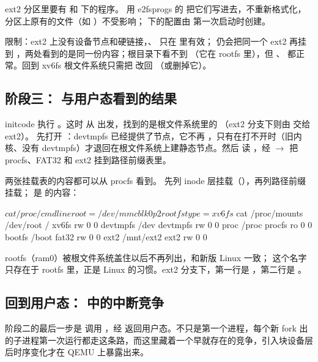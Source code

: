 ext2 分区里要有  和  下的程序。 用 e2fsprogs 的  把它们写进去，不重新格式化，分区上原有的文件（如 ）不受影响； 下的配置由  第一次启动时创建。

限制：ext2 上没有设备节点和硬链接，、 只在  里有效； 仍会把同一个 ext2 再挂到 ，两处看到的是同一份内容；根目录下看不到 （它在 rootfs 里），但 、 都正常。回到 xv6fs 根文件系统只需把  改回 （或删掉它）。

\subsection{阶段三： 与用户态看到的结果}
\label{sec:ns-stage3}

initcode 执行 。这时  从  出发，找到的是根文件系统里的 （ext2 分支下则由  交给 ext2）。 先打开 ：devtmpfs 已经提供了节点，它不再 ，只有在打不开时（旧内核、没有 devtmpfs）才退回在根文件系统上建静态节点。然后  读 ，经  $\to$  把 procfs、FAT32 和 ext2 挂到路径前缀表里。

两张挂载表的内容都可以从 procfs 看到。 先列 inode 层挂载（），再列路径前缀挂载； 是  的内容：

\begin{txtcode}
$ cat /proc/cmdline
root=/dev/mmcblk0p2 rootfstype=xv6fs
$ cat /proc/mounts
/dev/root / xv6fs rw 0 0
devtmpfs /dev devtmpfs rw 0 0
proc /proc procfs ro 0 0
bootfs /boot fat32 rw 0 0
ext2 /mnt/ext2 ext2 rw 0 0
\end{txtcode}

rootfs（ram0）被根文件系统盖住以后不再列出，和新版 Linux 一致； 这个名字只存在于 rootfs 里，正是 Linux 的习惯。ext2 分支下，第一行是 ，第二行是 。

\subsection{回到用户态： 中的中断竞争}

阶段二的最后一步是  调用 ，经  返回用户态。不只是第一个进程，每个新 fork 出的子进程第一次运行都走这条路，而这里藏着一个早就存在的竞争，引入块设备层后时序变化才在 QEMU 上暴露出来。

